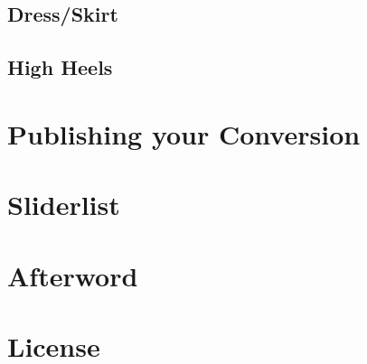 \documentclass[12pt]{article}
\begin{document}
\subsection{Dress/Skirt}

\pagebreak
\subsection{High Heels}

\pagebreak
\section{Publishing your Conversion}

\pagebreak
\section{Sliderlist}

\pagebreak
\section{Afterword}

\section{License}

\end{document}
